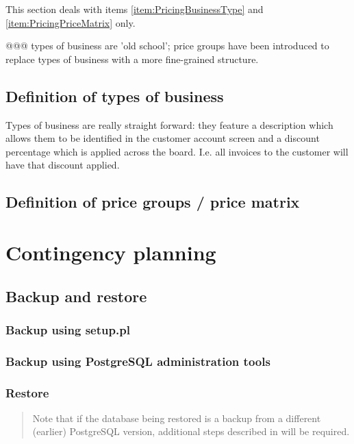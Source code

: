 This section deals with items \ref{item:PricingBusinessType} and \ref{item:PricingPriceMatrix} only.

@@@ types of business are 'old school'; price groups have been introduced to replace types of business with a more fine-grained structure.

\section{Definition of types of business}

Types of business are really straight forward: they feature a description
which allows them to be identified in the customer account screen and a discount
percentage which is applied across the board. I.e. all invoices to the customer
will have that discount applied.

\section{Definition of price groups / price matrix}

\chapter{Contingency planning}

\section{Backup and restore}

\subsection{Backup using setup.pl}



\subsection{Backup using PostgreSQL administration tools}

\subsection{Restore}

\begin{quotation}
Note that if the database being restored is a backup from a different (earlier) PostgreSQL version,
additional steps described in  will be required.
\end{quotation}




